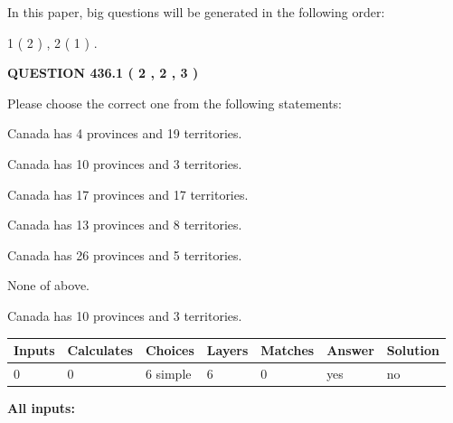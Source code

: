 \documentclass[12pt]{article}
\begin{document}
In this paper, big questions will be generated in the following order: 
   
   
   1 ( 2 )
 ,
   2 ( 1 )
 .
  
\vspace{0.2in}
  
{\textbf{\Large{QUESTION
436.1 
 ( 2 , 2 , 3 )
}}}
  
  
Please choose the correct one from the following statements:
 
 
Canada has   4 provinces and  19 territories.
 
 
Canada has 10  provinces and 3 territories.
 
 
Canada has  17 provinces and  17 territories.
 
 
Canada has  13 provinces and  8 territories.
 
 
Canada has  26 provinces and  5 territories.
 
 
 None of above.
 
 
\noindent{}
 
 
Canada has 10  provinces and 3 territories.
 
 
\noindent{}
 
 
   
   
   
   
\noindent\begin{tabular}{|l|l|l|l|l|l|l|}
 \hline
Inputs & Calculates & Choices & Layers & Matches & Answer & Solution \\ \hline
 0  & 
 0  & 
 6
  simple  
  & 
 6  & 
 0  & 
  yes & 
  no 
  \\ \hline
 \end{tabular}
   
   
   
   
\noindent{}
   
   
   
   
\noindent\vspace{0.1in}\hspace{-0.08in} {\textbf{\Large{All inputs: }}}
   
\end{document}

